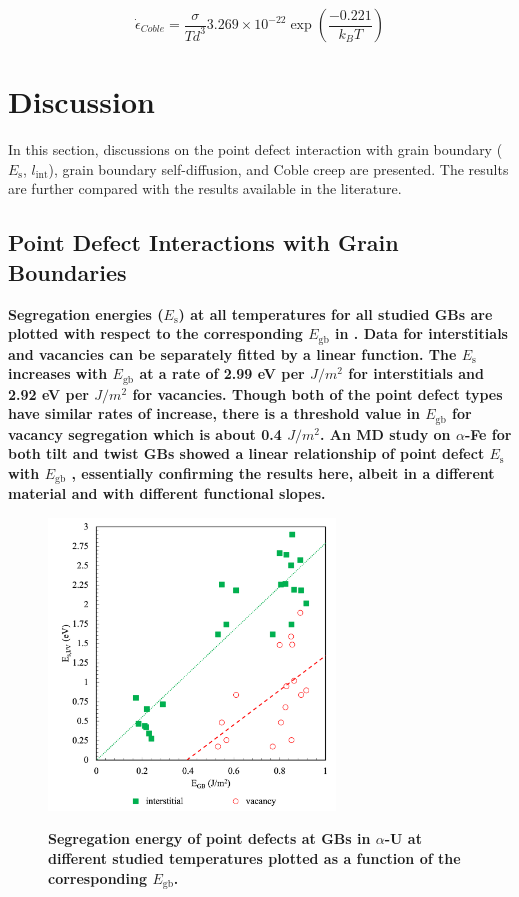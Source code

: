 \documentclass[review]{elsarticle}
\providecommand{\DIFaddtex}[1]{{\bf #1}} %
\providecommand{\DIFaddbegin}{\protect\color{blue}} %
\providecommand{\DIFaddFL}[1]{\DIFadd{#1}} %
\providecommand{\DIFadd}[1]{\texorpdfstring{\DIFaddtex{#1}}{#1}} %
\newcommand{\DIFaddincludegraphics}[2][]{{\color{blue}\fbox{\DIFOincludegraphics[#1]{#2}}}} %
\DeclareRobustCommand{\DIFaddbegin}{\DIFOaddbegin \let\includegraphics\DIFaddincludegraphics} %
\begin{document}
\begin{equation}
\label{eq:coble2}
\dot{\epsilon}_{Coble} =\frac{\sigma}{T d^{3}} 3.269 \times 10^{-22} \exp\left(\frac{-0.221}{k_{B} T}\right)
\end{equation}



\FloatBarrier

\section{Discussion}

In this section, discussions on the point defect interaction with grain boundary ($E_{\mathrm{s}}$, $l_{\mathrm{int}}$), grain boundary self-diffusion, and Coble creep are presented. The results are further compared with the results available in the literature. 

\subsection{Point Defect Interactions with Grain Boundaries}

\DIFaddbegin \par \DIFadd{Segregation energies ($E_{\mathrm{s}}$) at all temperatures for all studied GBs are plotted with respect to the corresponding  $E_{\mathrm{gb}}$  in \Cref{fig:SE_GB}. Data for interstitials and vacancies can be separately fitted by a linear function. The $E_{\mathrm{s}}$ increases with  $E_{\mathrm{gb}}$  at a rate of 2.99 eV per $J/m{^2}$ for interstitials and 2.92 eV per $J/m^2$ for vacancies. Though both of the point defect types have similar rates of increase, there is a threshold value in $E_{\mathrm{gb}}$ for vacancy segregation which is about 0.4 $J/m^2$. An MD study on $\alpha$-Fe for both tilt and twist GBs showed a linear relationship of point defect $E_{\mathrm{s}}$ with $E_{\mathrm{gb}}$ \cite{tschopp2012probing}, essentially confirming the results here, albeit in a different material and with different functional slopes. 
}

\begin{figure}[h!]
\centering
\includegraphics[width = 3in]{13_SE_GB.png}\\
\caption{\DIFaddFL{Segregation energy of point defects at GBs in $\alpha$-U at different studied temperatures plotted as a function of the corresponding $E_{\mathrm{gb}}$.}}
\label{fig:SE_GB}
\end{figure}
\end{document}
